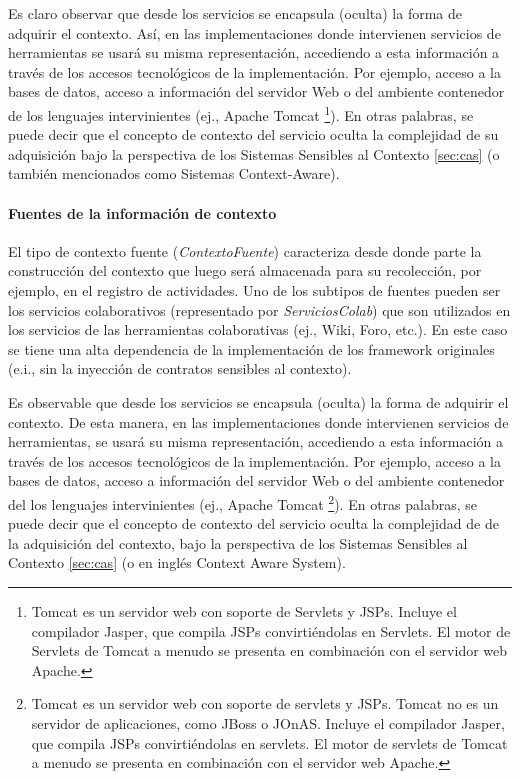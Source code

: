 Es claro observar que desde los servicios se encapsula (oculta) la forma de
adquirir el contexto. Así, en las implementaciones
donde intervienen servicios de herramientas se usará su misma
representación, accediendo a esta información a través de los accesos
tecnológicos de la implementación. Por ejemplo, acceso a la bases de datos,
acceso a información del servidor Web o del ambiente contenedor de los
lenguajes intervinientes (ej., Apache Tomcat \footnote{Tomcat es un servidor web
con soporte de Servlets y JSPs. Incluye el compilador Jasper, que compila JSPs
convirtiéndolas en
Servlets. El motor de Servlets de Tomcat a menudo se presenta en combinación con
el servidor web Apache.}). En otras palabras, se puede decir que el concepto de
contexto del servicio oculta la complejidad de su adquisición
bajo la perspectiva de los Sistemas Sensibles al Contexto \ref{sec:cas} (o
también mencionados como Sistemas Context-Aware).



\paragraph{Fuentes de la información de contexto}

El tipo de contexto fuente (\textit{ContextoFuente}) caracteriza desde donde
parte la construcción del
contexto que luego será almacenada para su recolección, por ejemplo, en el
registro de actividades. Uno de los subtipos de fuentes pueden ser los
servicios colaborativos (representado por \textit{ServiciosColab}) que son
utilizados en los servicios de las herramientas colaborativas (ej., Wiki, Foro,
etc.).
En este caso se tiene una alta dependencia de la implementación de los
framework originales (e.i., sin la inyección de contratos sensibles al
contexto). 

Es observable que desde los servicios se encapsula (oculta) la forma de
adquirir el contexto. De esta manera, en las implementaciones
donde intervienen servicios de herramientas, se usará su misma
representación, accediendo a esta información a través de los accesos
tecnológicos de la implementación. Por ejemplo, acceso a la bases de datos,
acceso a información del servidor Web o del ambiente contenedor del los
lenguajes intervinientes (ej., Apache Tomcat \footnote{Tomcat es un servidor web
con soporte de servlets y JSPs. Tomcat no es un servidor de aplicaciones, como
JBoss o JOnAS. Incluye el compilador Jasper, que compila JSPs convirtiéndolas en
servlets. El motor de servlets de Tomcat a menudo se presenta en combinación con
el servidor web Apache.}). En otras palabras, se puede decir que el concepto de
contexto del servicio oculta la complejidad de de la adquisición del contexto,
bajo la perspectiva de los Sistemas Sensibles al Contexto \ref{sec:cas} (o en
inglés Context Aware System).



